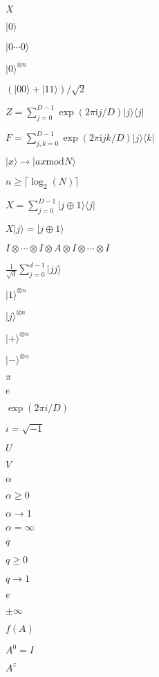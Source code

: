 \documentclass{article}
\begin{document}
$ X$
\pagebreak

$|0\rangle$
\pagebreak

$|0\cdots 0\rangle$
\pagebreak

$|0\rangle^{\otimes n}$
\pagebreak

$(|00\rangle + |11\rangle)/\sqrt{2}$
\pagebreak

$ Z = \sum_{j=0}^{D-1} \exp(2\pi \mathrm{i} j/D) |j\rangle\langle j| $
\pagebreak

$ F = \sum_{j,k=0}^{D-1} \exp(2\pi \mathrm{i} jk/D) |j\rangle\langle k| $
\pagebreak

$ |x\rangle \longrightarrow |ax \mathrm{ mod } N\rangle $
\pagebreak

$ n \geq \lceil\log_2(N)\rceil $
\pagebreak

$ X = \sum_{j=0}^{D-1} |j\oplus 1\rangle\langle j| $
\pagebreak

$ X|j\rangle = |j\oplus 1\rangle$
\pagebreak

$ I\otimes\cdots\otimes I\otimes A \otimes I \otimes\cdots\otimes I$
\pagebreak

$\frac{1}{\sqrt{d}}\sum_{j=0}^{d-1}|jj\rangle$
\pagebreak

$|1\rangle^{\otimes n}$
\pagebreak

$|j\rangle^{\otimes n}$
\pagebreak

$|+\rangle^{\otimes n}$
\pagebreak

$|-\rangle^{\otimes n}$
\pagebreak

$ \pi $
\pagebreak

$e$
\pagebreak

$\exp(2\pi i/D)$
\pagebreak

$i=\sqrt{-1}$
\pagebreak

$ U $
\pagebreak

$ V $
\pagebreak

$\alpha$
\pagebreak

$\alpha\geq 0$
\pagebreak

$ \alpha\to 1$
\pagebreak

$\alpha = \infty$
\pagebreak

$q$
\pagebreak

$q\geq 0$
\pagebreak

$ q\to 1$
\pagebreak

$ e $
\pagebreak

$\pm \infty$
\pagebreak

$f(A)$
\pagebreak

$A^0 = I$
\pagebreak

$A^z$
\pagebreak
\end{document}
